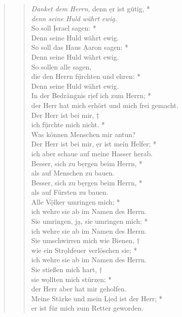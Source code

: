 \begin{quote}
\begin{verse}
 

\textit{Danket dem Herrn,} denn \d er ist gütig, *\\
\textit{denn seine Huld währt ewig.}\\
\vin So soll \d Israel sagen: *\\
\vin Denn seine Huld währt ewig.\\
So soll das Haus \d Aaron sagen: *\\
Denn seine Huld währt ewig.\\
\vin So sollen alle sagen,\\
\vin die den Herrn f\d ürchten und ehren: *\\
\vin Denn seine Huld währt ewig.\\
In der Bedrängnis r\d ief ich zum Herrn; *\\ 
der Herr hat mich erhört und mich frei gemacht.\\
\vin Der Herr ist bei mir, †\\
\vin ich f\d ürchte mich nicht. *\\
\vin Was können Menschen mir antun?\\
Der Herr ist bei mir, \d er ist mein Helfer; *\\
ich aber schaue auf meine Hasser herab.\\
\vin Besser, sich zu b\d ergen beim Herrn, *\\
\vin als auf Menschen zu bauen.\\
Besser, sich zu b\d ergen beim Herrn, *\\
als auf Fürsten zu bauen.\\
\vin Alle V\d ölker umringen mich; *\\
\vin ich wehre sie ab im Namen des Herrn.\\
Sie umringen, j\d a, sie umringen mich; *\\
ich wehre sie ab im Namen des Herrn.\\
\vin Sie umschwirren mich wie Bienen, †\\
\vin wie ein Str\d ohfeuer verlöschen sie; *\\
\vin ich wehre sie ab im Namen des Herrn.\\
Sie stießen mich hart, †\\
sie w\d ollten mich stürzen; *\\
der Herr aber hat mir geholfen.\\
\vin Meine Stärke und mein L\d ied ist der Herr; *\\
\vin er ist für mich zum Retter geworden.\\

\end{verse}
\end{quote}

